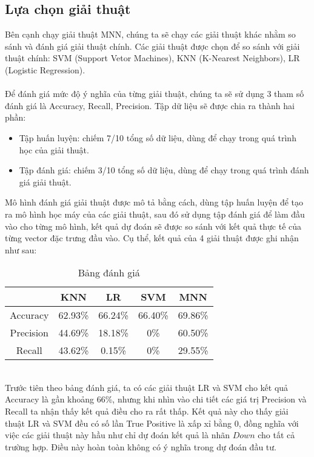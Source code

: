 \subsection{Lựa chọn giải thuật}
Bên cạnh chạy giải thuật MNN, chúng ta sẽ chạy các giải thuật khác nhằm so sánh 
và đánh giá giải thuật chính. Các giải thuật được chọn để so sánh với giải thuật 
chính: SVM (Support Vetor Machines), KNN (K-Nearest Neighbors), LR (Logistic Regression).\\\\
Để đánh giá mức độ ý nghĩa của từng giải thuật, chúng ta sẽ sử dụng 3 tham số 
đánh giá là Accuracy, Recall, Precision. Tập dữ liệu sẽ được chia ra thành hai phần:
\begin{itemize}
\item Tập huấn luyện: chiếm 7/10 tổng số dữ liệu, dùng để chạy trong quá trình 
học của giải thuật.
\item Tập đánh giá: chiếm 3/10 tổng số dữ liệu, dùng để chạy trong quá trình 
đánh giá giải thuật.
\end{itemize}
Mô hình đánh giá giải thuật được mô tả bằng cách, dùng tập huấn luyện để tạo 
ra mô hình học máy của các giải thuật, sau đó sử dụng tập đánh giá để làm đầu 
vào cho từng mô hình, kết quả dự đoán sẽ được so sánh với kết quả thực tế của 
từng vector đặc trưng đầu vào. Cụ thể, kết quả của 4 giải thuật được ghi nhận 
như sau:
\begin{table}[h]
\centering
\fontsize{8}{9}\selectfont
\begin{tabular}{ |c|c|c|c|c| }
\hline
 & KNN & LR & SVM & MNN \\
\hline
Accuracy & 62.93\% & 66.24\% & 66.40\% & 69.86\% \\
\hline
Precision & 44.69\% & 18.18\% & 0\% & 60.50\% \\
\hline
Recall & 43.62\% & 0.15\% & 0\% & 29.55\% \\
\hline
\end{tabular}
\caption{Bảng đánh giá}
\end{table}\\
Trước tiên theo bảng đánh giá, ta có các giải thuật LR và SVM cho kết quả Accuracy
là gần khoảng 66\%, nhưng khi nhìn vào chi tiết các giá trị Precision và Recall 
ta nhận thấy kết quả điều cho ra rất thấp. Kết quả này cho thấy giải thuật LR 
và SVM đều có số lần True Positive là xấp xỉ bằng 0, đồng nghĩa với việc các 
giải thuật này hầu như chỉ dự đoán kết quả là nhãn $Down$ cho tất cả trường hợp. 
Điều này hoàn toàn không có ý nghĩa trong dự đoán đầu tư.\\\\
